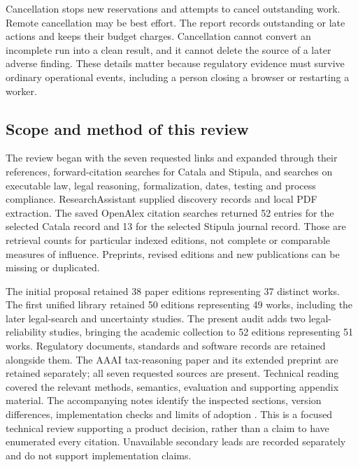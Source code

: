 Cancellation stops new reservations and attempts to cancel outstanding work.
Remote cancellation may be best effort. The report records outstanding or late
actions and keeps their budget charges. Cancellation cannot convert an incomplete
run into a clean result, and it cannot delete the source of a later adverse
finding. These details matter because regulatory evidence must survive ordinary
operational events, including a person closing a browser or restarting a worker.


\subsection{Scope and method of this review}
\label{merge:P-02-literature:01}


The review began with the seven requested links and expanded through their
references, forward-citation searches for Catala and Stipula, and searches on
executable law, legal reasoning, formalization, dates, testing and process
compliance. ResearchAssistant supplied discovery records and local PDF extraction.
The saved OpenAlex citation searches returned 52 entries for the selected Catala
record and 13 for the selected Stipula journal record. Those are retrieval counts
for particular indexed editions, not complete or comparable measures of influence.
Preprints, revised editions and new publications can be missing or duplicated.

The initial proposal retained 38 paper editions representing 37 distinct
works. The first unified library retained 50 editions representing 49 works,
including the later legal-search and uncertainty studies. The present
audit adds two legal-reliability studies, bringing the academic collection
to 52 editions representing 51 works. Regulatory documents, standards
and software records are retained alongside them.
The AAAI tax-reasoning paper and its extended preprint are retained separately;
all seven requested sources are present. Technical reading covered the relevant
methods, semantics, evaluation and supporting appendix material. The accompanying
notes identify the inspected sections, version differences, implementation checks
and limits of adoption \citep{libraryreview}. This is a focused technical review
supporting a product decision, rather than a claim to have enumerated every
citation. Unavailable secondary leads are recorded separately and do not support
implementation claims.

